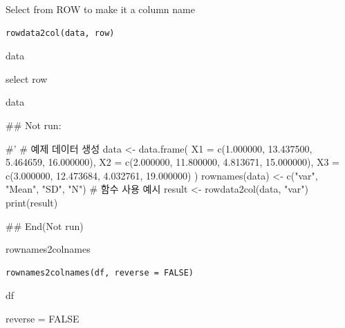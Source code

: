 \documentclass[a4paper]{book}
\begin{document}
%
\begin{Description}
Select from ROW to make it a column name
\end{Description}
%
\begin{Usage}
\begin{verbatim}
rowdata2col(data, row)
\end{verbatim}
\end{Usage}
%
\begin{Arguments}
\begin{ldescription}
\item[\code{data}] data

\item[\code{row}] select row
\end{ldescription}
\end{Arguments}
%
\begin{Value}
data
\end{Value}
%
\begin{Examples}
\begin{ExampleCode}


## Not run: 

#'
# 예제 데이터 생성
data <- data.frame(
  X1 = c(1.000000, 13.437500, 5.464659, 16.000000),
  X2 = c(2.000000, 11.800000, 4.813671, 15.000000),
  X3 = c(3.000000, 12.473684, 4.032761, 19.000000)
)
rownames(data) <- c("var", "Mean", "SD", "N")
# 함수 사용 예시
result <- rowdata2col(data, "var")
print(result)



## End(Not run)
\end{ExampleCode}
\end{Examples}
%
\begin{Description}
rownames2colnames
\end{Description}
%
\begin{Usage}
\begin{verbatim}
rownames2colnames(df, reverse = FALSE)
\end{verbatim}
\end{Usage}
%
\begin{Arguments}
\begin{ldescription}
\item[\code{df}] df

\item[\code{reverse}] reverse = FALSE
\end{ldescription}
\end{Arguments}
\end{document}
